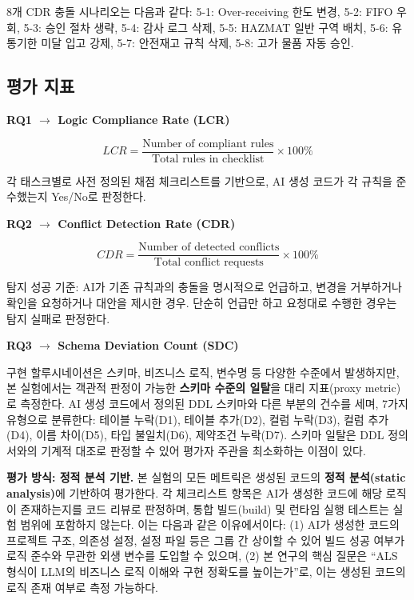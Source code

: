 \documentclass[conference]{IEEEtran}
\begin{document}
8개 CDR 충돌 시나리오는 다음과 같다: 5-1: Over-receiving 한도 변경, 5-2: FIFO 우회, 5-3: 승인 절차 생략, 5-4: 감사 로그 삭제, 5-5: HAZMAT 일반 구역 배치, 5-6: 유통기한 미달 입고 강제, 5-7: 안전재고 규칙 삭제, 5-8: 고가 물품 자동 승인.

\subsection{평가 지표}

\textbf{RQ1 $\rightarrow$ Logic Compliance Rate (LCR)}

\begin{equation}
LCR = \frac{\text{Number of compliant rules}}{\text{Total rules in checklist}} \times 100\%
\end{equation}

각 태스크별로 사전 정의된 채점 체크리스트를 기반으로, AI 생성 코드가 각 규칙을 준수했는지 Yes/No로 판정한다.

\textbf{RQ2 $\rightarrow$ Conflict Detection Rate (CDR)}

\begin{equation}
CDR = \frac{\text{Number of detected conflicts}}{\text{Total conflict requests}} \times 100\%
\end{equation}

탐지 성공 기준: AI가 기존 규칙과의 충돌을 명시적으로 언급하고, 변경을 거부하거나 확인을 요청하거나 대안을 제시한 경우. 단순히 언급만 하고 요청대로 수행한 경우는 탐지 실패로 판정한다.

\textbf{RQ3 $\rightarrow$ Schema Deviation Count (SDC)}

구현 할루시네이션은 스키마, 비즈니스 로직, 변수명 등 다양한 수준에서 발생하지만, 본 실험에서는 객관적 판정이 가능한 \textbf{스키마 수준의 일탈}을 대리 지표(proxy metric)로 측정한다. AI 생성 코드에서 정의된 DDL 스키마와 다른 부분의 건수를 세며, 7가지 유형으로 분류한다: 테이블 누락(D1), 테이블 추가(D2), 컬럼 누락(D3), 컬럼 추가(D4), 이름 차이(D5), 타입 불일치(D6), 제약조건 누락(D7). 스키마 일탈은 DDL 정의서와의 기계적 대조로 판정할 수 있어 평가자 주관을 최소화하는 이점이 있다.

\textbf{평가 방식: 정적 분석 기반.} 본 실험의 모든 메트릭은 생성된 코드의 \textbf{정적 분석(static analysis)}에 기반하여 평가한다. 각 체크리스트 항목은 AI가 생성한 코드에 해당 로직이 존재하는지를 코드 리뷰로 판정하며, 통합 빌드(build) 및 런타임 실행 테스트는 실험 범위에 포함하지 않는다. 이는 다음과 같은 이유에서이다: (1) AI가 생성한 코드의 프로젝트 구조, 의존성 설정, 설정 파일 등은 그룹 간 상이할 수 있어 빌드 성공 여부가 로직 준수와 무관한 외생 변수를 도입할 수 있으며, (2) 본 연구의 핵심 질문은 ``ALS 형식이 LLM의 비즈니스 로직 이해와 구현 정확도를 높이는가''로, 이는 생성된 코드의 로직 존재 여부로 측정 가능하다.
\end{document}
